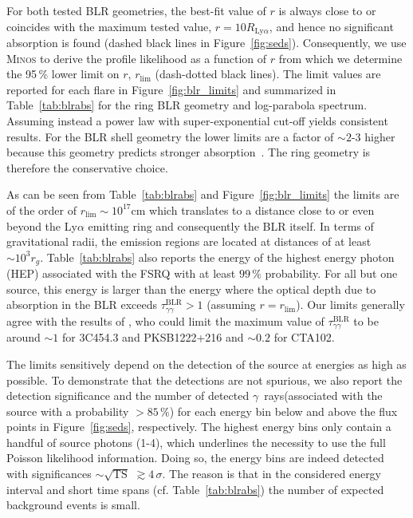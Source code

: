 \documentclass[twocolumn,linenumbers]{aastex62}
\newcommand{\Grays}{$\gamma$~rays\xspace}
\begin{document}
For both tested BLR geometries, the best-fit value of $r$ is always close to or coincides with the maximum tested value, $r = 10R_{\mathrm{Ly}\alpha}$, and hence no significant absorption is found (dashed black lines in Figure~\ref{fig:seds}). Consequently,  we use \textsc{Minos} to derive the profile likelihood as a function of $r$ from which we determine the 95\,\% lower limit on $r$, $r_\mathrm{lim}$ (dash-dotted black lines). 
The limit values are reported for each flare in Figure~\ref{fig:blr_limits} and  summarized in Table~\ref{tab:blrabs} for the ring BLR geometry and log-parabola spectrum.
Assuming instead a power law with super-exponential cut-off yields consistent results. 
For the BLR shell geometry the lower limits are a factor of $\sim2$-$3$ higher because this geometry predicts stronger absorption~\citep{finke2016}. The ring geometry is therefore the conservative choice. 

As can be seen from Table~\ref{tab:blrabs} and Figure~\ref{fig:blr_limits} the limits are of the order of $r_\mathrm{lim}\sim10^{17}$cm which translates to a distance close to or even beyond the Ly$\alpha$ emitting ring and consequently the BLR itself. In terms of gravitational radii, the emission regions are located at distances of at least $\sim10^3r_g$. 
Table~\ref{tab:blrabs} also reports the energy of the highest energy photon (HEP) associated with the FSRQ with at least $99\,\%$ probability. For all but one source, this energy is larger than the energy where the optical depth due to absorption in the BLR exceeds $\tau_{\gamma\gamma}^\mathrm{BLR} > 1$ (assuming $r = r_\mathrm{lim}$).
Our limits generally agree with the results of \citet{2018MNRAS.477.4749C}, who could limit the maximum value of $\tau_{\gamma\gamma}^\mathrm{BLR}$ to be around $\sim 1$ for 3C454.3 and PKSB1222+216 and $\sim 0.2$ for CTA102. 

The limits sensitively depend on the detection of the source at energies as high as possible. To demonstrate that the detections are not spurious, we also report the detection significance and the number of detected \Grays (associated with the source with a probability $>85\,\%$) for each energy bin below and above the flux points in Figure~\ref{fig:seds}, respectively. The highest energy bins only contain a handful of source photons (1-4), which underlines the necessity to use the full Poisson likelihood information. 
Doing so, the energy bins are indeed detected with significances $\sim \sqrt{\mathrm{TS}}$ $\gtrsim 4\,\sigma$.
The reason is that in the considered energy interval and short time spans (cf. Table~\ref{tab:blrabs}) the number of expected background events is small. 
\end{document}
